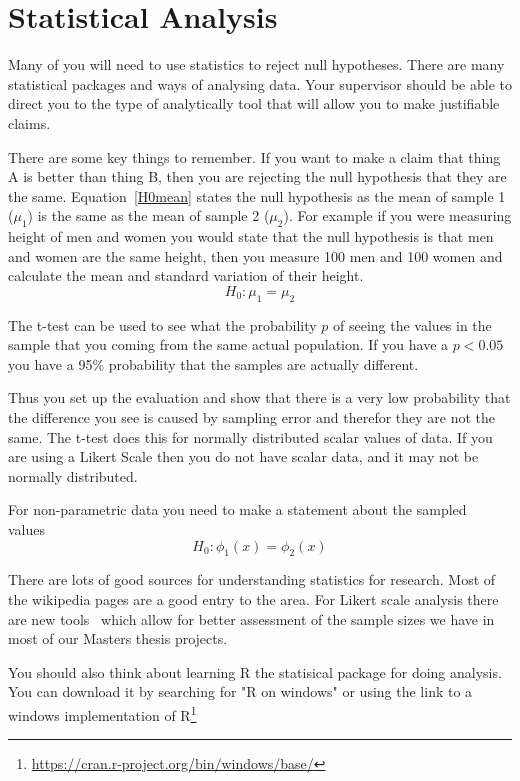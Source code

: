 \section{Statistical Analysis}

Many of you will need to use statistics to reject null hypotheses.  There are many statistical packages and ways of analysing data.  Your supervisor should be able to direct you to the type of analytically tool that will allow you to make justifiable claims.

There are some key things to remember.  If you want to make a claim that thing A is better than thing B, then you are rejecting the null hypothesis that they are the same. Equation~\ref{H0mean} states the null hypothesis as the mean of sample 1 ($\mu_1$) is the same as the mean of sample 2 ($\mu_2$). For example if you were measuring height of men and women you would state that the null hypothesis is that men and women are the same height, then you measure 100 men and 100 women and calculate the mean and standard variation of their height. 
\begin{equation} 
\label{H0mean}
    H_0 : \mu_1 = \mu_2
\end{equation}

The t-test can be used to see what the probability $p$ of seeing the values in the sample that you coming from the same actual population. If you have a $p<0.05$ you have a 95\% probability that the samples are actually different.

Thus you set up the evaluation and show that there is a very low probability that the difference you see is caused by sampling error and therefor they are not the same.  The t-test does this for normally distributed scalar values of data. If you are using a Likert Scale then you do not have scalar data, and it may not be normally distributed.

For non-parametric data you need to make a statement about the sampled values~\cite{Kaptein2010}
\begin{equation} 
\label{H0sample}
    H_0 : \phi_1(x) = \phi_2(x)
\end{equation}

There are lots of good sources for understanding statistics for research.  Most of the wikipedia pages are a good entry to the area. For Likert scale analysis there are new tools~\cite{Kaptein2010} which allow for better assessment of the sample sizes we have in most of our Masters thesis projects.

You should also think about learning R the statisical package for doing analysis.  You can download it by searching for "R on windows" or using the link to a windows implementation of R\footnote{\url{https://cran.r-project.org/bin/windows/base/}}


